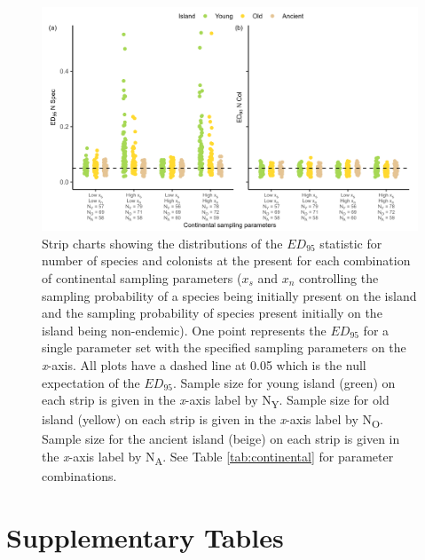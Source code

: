 \begin{figure}
    \centering
    \includegraphics[width=\textwidth]{JBI-21-0508_FigS15.png}
    \caption{Strip charts showing the distributions of the $ED_{95}$ statistic for number of species and colonists at the present for each combination of continental sampling parameters ($x_s$ and $x_n$ controlling the sampling probability of a species being initially present on the island and the sampling probability of species present initially on the island being non-endemic). One point represents the $ED_{95}$ for a single parameter set with the specified sampling parameters on the \textit{x}-axis. All plots have a dashed line at 0.05 which is the null expectation of the $ED_{95}$. Sample size for young island (green) on each strip is given in the \textit{x}-axis label by N\textsubscript{Y}. Sample size for old island (yellow) on each strip is given in the \textit{x}-axis label by N\textsubscript{O}. Sample size for the ancient island (beige) on each strip is given in the \textit{x}-axis label by N\textsubscript{A}. See Table \ref{tab:continental} for parameter combinations.}
    \label{fig:continental_spec_col_facet_}
\end{figure}

\clearpage

\section*{Supplementary Tables}

